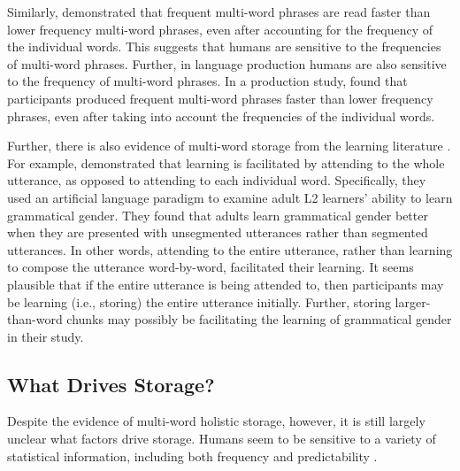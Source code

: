 \documentclass[
  authoryear,
  preprint,
  1p,
  onecolumn]{elsarticle}
\begin{document}
Similarly, \citet{arnon2010} demonstrated that frequent multi-word
phrases are read faster than lower frequency multi-word phrases, even
after accounting for the frequency of the individual words. This
suggests that humans are sensitive to the frequencies of multi-word
phrases. Further, in language production humans are also sensitive to
the frequency of multi-word phrases. In a production study,
\citet{janssenPhraseFrequencyEffects2012} found that participants
produced frequent multi-word phrases faster than lower frequency
phrases, even after taking into account the frequencies of the
individual words.

Further, there is also evidence of multi-word storage from the learning
literature \citep{siegelman2015, bannardStoredWordSequences2008}. For
example, \citet{siegelman2015} demonstrated that learning is facilitated
by attending to the whole utterance, as opposed to attending to each
individual word. Specifically, they used an artificial language paradigm
to examine adult L2 learners' ability to learn grammatical gender. They
found that adults learn grammatical gender better when they are
presented with unsegmented utterances rather than segmented utterances.
In other words, attending to the entire utterance, rather than learning
to compose the utterance word-by-word, facilitated their learning. It
seems plausible that if the entire utterance is being attended to, then
participants may be learning (i.e., storing) the entire utterance
initially. Further, storing larger-than-word chunks may possibly be
facilitating the learning of grammatical gender in their study.

\subsection{What Drives Storage?}\label{what-drives-storage}

Despite the evidence of multi-word holistic storage, however, it is
still largely unclear what factors drive storage. Humans seem to be
sensitive to a variety of statistical information, including both
frequency \citep[e.g.,][]{bybee1999, maye2000, kapatsinski2009, lee2015}
and predictability \citep[e.g,][]{olejarczuk2018, ramscar2013}.
\end{document}
